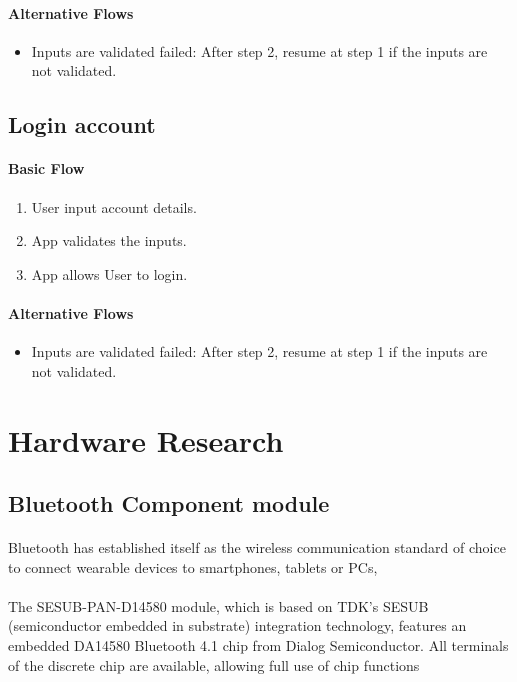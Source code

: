 \documentclass[12pt,a4paper]{article}
\begin{document}
\begin{appendices}
      \paragraph{Alternative Flows}
        \begin{itemize}
          \item Inputs are validated failed: After step 2, resume at step 1 if the inputs are not validated.
        \end{itemize}
      
      \subsection{Login account}
      \paragraph{Basic Flow}
        \begin{enumerate}
          \item User input account details.
          \item App validates the inputs.
          \item App allows User to login.
        \end{enumerate}
      \paragraph{Alternative Flows}
        \begin{itemize}
          \item Inputs are validated failed: After step 2, resume at step 1 if the inputs are not validated.
        \end{itemize}
    
    \section{Hardware Research}
     \label{appendix:hardware-research}
    \subsection{Bluetooth Component module}
      \paragraph{}
      Bluetooth has established itself as the wireless communication standard of choice to connect wearable devices to smartphones, tablets or PCs,
      \paragraph{}
      The SESUB-PAN-D14580 module, which is based on TDK's SESUB (semiconductor embedded in substrate) integration technology, features an embedded DA14580 Bluetooth 4.1 chip from Dialog Semiconductor. All terminals of the discrete chip are available, allowing full use of chip functions

\end{appendices}
\end{document}

